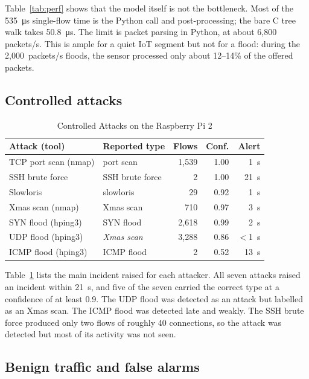 \documentclass[conference]{IEEEtran}
\begin{document}
Table~\ref{tab:perf} shows that the model itself is not the bottleneck.
Most of the \SI{535}{\micro\second} single-flow time is the Python call
and post-processing; the bare C tree walk takes \SI{50.8}{\micro\second}.
The limit is packet parsing in Python, at about 6{,}800 packets/s. This is
ample for a quiet IoT segment but not for a flood: during the
2{,}000~packets/s floods, the sensor processed only about 12--14\% of the
offered packets.

\subsection{Controlled attacks}

\begin{table}[t]
\caption{Controlled Attacks on the Raspberry Pi 2}
\label{tab:attacks}
\centering
\begin{tabular}{@{}llrrr@{}}
\toprule
Attack (tool) & Reported type & Flows & Conf. & Alert \\
\midrule
TCP port scan (nmap)      & port scan      & 1{,}539 & 1.00 & 1~s \\
SSH brute force           & SSH brute force & 2      & 1.00 & 21~s \\
Slowloris                 & slowloris      & 29      & 0.92 & 1~s \\
Xmas scan (nmap)          & Xmas scan      & 710     & 0.97 & 3~s \\
SYN flood (hping3)        & SYN flood      & 2{,}618 & 0.99 & 2~s \\
UDP flood (hping3)        & \textit{Xmas scan} & 3{,}288 & 0.86 & $<$1~s \\
ICMP flood (hping3)       & ICMP flood     & 2       & 0.52 & 13~s \\
\bottomrule
\end{tabular}
\end{table}

Table~\ref{tab:attacks} lists the main incident raised for each attacker.
All seven attacks raised an incident within 21~s, and five of the seven
carried the correct type at a confidence of at least 0.9. The UDP flood was
detected as an attack but labelled as an Xmas scan. The ICMP flood was
detected late and weakly. The SSH brute force produced only two flows of
roughly 40 connections, so the attack was detected but most of its
activity was not seen.

\subsection{Benign traffic and false alarms}
\end{document}
